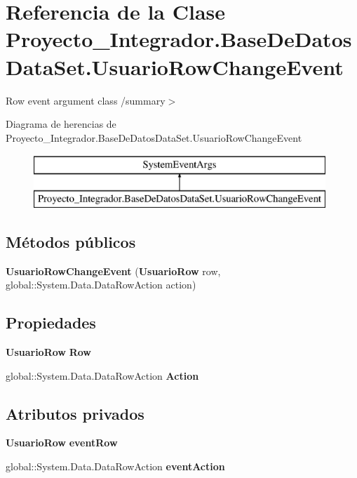 \section{Referencia de la Clase Proyecto\-\_\-\-Integrador.\-Base\-De\-Datos\-Data\-Set.\-Usuario\-Row\-Change\-Event}
\label{class_proyecto___integrador_1_1_base_de_datos_data_set_1_1_usuario_row_change_event}


Row event argument class /summary$>$  


Diagrama de herencias de Proyecto\-\_\-\-Integrador.\-Base\-De\-Datos\-Data\-Set.\-Usuario\-Row\-Change\-Event\begin{figure}[H]
\begin{center}
\leavevmode
\includegraphics[height=2.000000cm]{class_proyecto___integrador_1_1_base_de_datos_data_set_1_1_usuario_row_change_event}
\end{center}
\end{figure}
\subsection*{Métodos públicos}
\begin{DoxyCompactItemize}
\item 
{\bf Usuario\-Row\-Change\-Event} ({\bf Usuario\-Row} row, global\-::\-System.\-Data.\-Data\-Row\-Action action)
\end{DoxyCompactItemize}
\subsection*{Propiedades}
\begin{DoxyCompactItemize}
\item 
{\bf Usuario\-Row} {\bf Row}\hspace{0.3cm}{\ttfamily  [get]}
\item 
global\-::\-System.\-Data.\-Data\-Row\-Action {\bf Action}\hspace{0.3cm}{\ttfamily  [get]}
\end{DoxyCompactItemize}
\subsection*{Atributos privados}
\begin{DoxyCompactItemize}
\item 
{\bf Usuario\-Row} {\bf event\-Row}
\item 
global\-::\-System.\-Data.\-Data\-Row\-Action {\bf event\-Action}
\end{DoxyCompactItemize}


